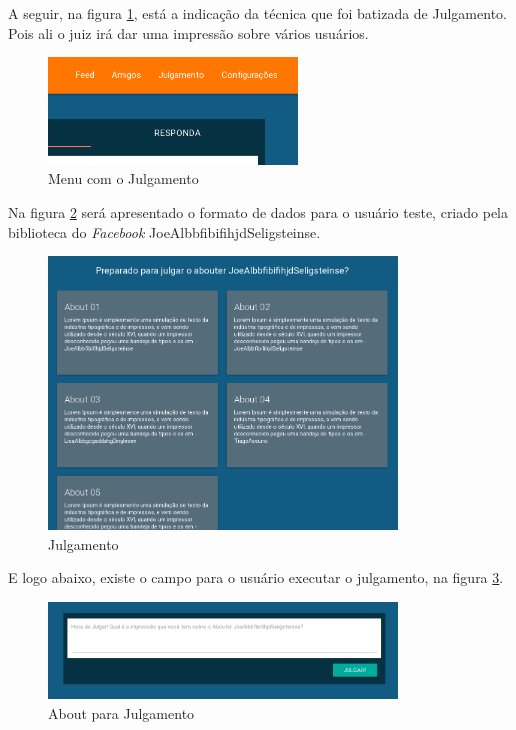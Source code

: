 A seguir, na figura \ref{fig:julgamento_menu}, está a indicação da técnica que foi batizada de Julgamento. Pois ali o juiz
irá dar uma impressão sobre vários usuários.

\begin{figure}[h]
    \centering
    \includegraphics[width=250px, scale=1]{figuras/julgamento_menu}
    \caption{Menu com o Julgamento}
    \label{fig:julgamento_menu}
\end{figure}

Na figura \ref{fig:julgamento} será apresentado o formato de dados para o usuário teste,
criado pela biblioteca do \textit{Facebook} JoeAlbbfibifihjdSeligsteinse.

\begin{figure}[h]
    \centering
    \includegraphics[width=350px, scale=1]{figuras/julgamento}
    \caption{Julgamento}
    \label{fig:julgamento}
\end{figure}

E logo abaixo, existe o campo para o usuário executar o julgamento, na figura \ref{fig:julgamento_about}.

\begin{figure}[h]
    \centering
    \includegraphics[width=350px, scale=1]{figuras/julgamento_about}
    \caption{About para Julgamento}
    \label{fig:julgamento_about}
\end{figure}


